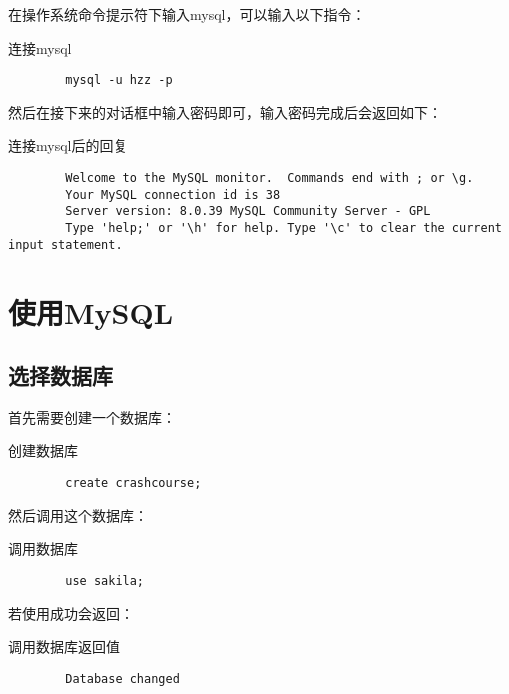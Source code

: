 \documentclass[UTF8]{article}
\begin{document}
在操作系统命令提示符下输入mysql，可以输入以下指令：
\begin{listing}[htb]
	\caption{连接mysql}
	\label{code:connectmysql}
\begin{verbatim}
        mysql -u hzz -p
\end{verbatim}
\end{listing}

然后在接下来的对话框中输入密码即可，输入密码完成后会返回如下：

\begin{listing}[htb]
	\caption{连接mysql后的回复}
	\label{code:respondforconnectmysql}
	\begin{verbatim}
        Welcome to the MySQL monitor.  Commands end with ; or \g.
        Your MySQL connection id is 38
        Server version: 8.0.39 MySQL Community Server - GPL
        Type 'help;' or '\h' for help. Type '\c' to clear the current input statement.
        \end{verbatim}
\end{listing}

\section{使用MySQL}

\subsection{选择数据库}

首先需要创建一个数据库：
\begin{listing}[H]
	\caption{创建数据库}
	\label{code:createdatabase}
	\begin{verbatim}
        create crashcourse;
        \end{verbatim}
\end{listing}

然后调用这个数据库：

\begin{listing}[H]
	\caption{调用数据库}
	\label{code:usedatabase}
	\begin{verbatim}
        use sakila;
\end{verbatim}
\end{listing}

若使用成功会返回：

\begin{listing}[H]
	\caption{调用数据库返回值}
	\label{code:respondforusedatabase}
	\begin{verbatim}
        Database changed
\end{verbatim}
\end{listing}
\end{document}
